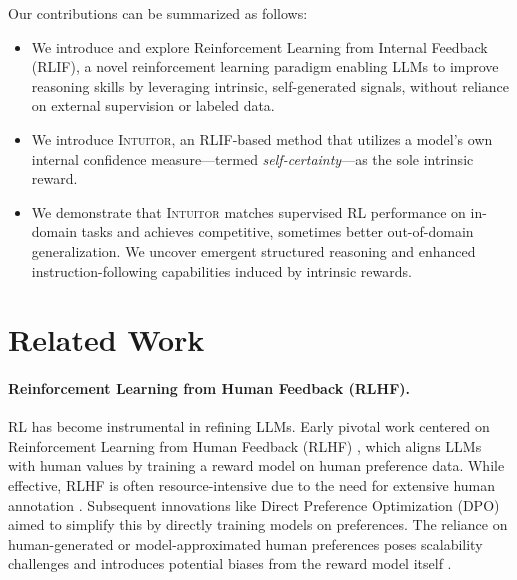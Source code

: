 \documentclass{article} %
\newcommand{\methodname}{\textsc{Intuitor}\xspace}
\begin{document}
Our contributions can be summarized as follows:
\begin{itemize}[leftmargin=*, nosep]
  \item We introduce and explore Reinforcement Learning from Internal Feedback (RLIF), a novel reinforcement learning paradigm enabling LLMs to improve reasoning skills by leveraging intrinsic,  self-generated signals, without reliance on external supervision or labeled data.
  \item We introduce \methodname, an RLIF-based method that utilizes a model's own internal confidence measure—termed \emph{self-certainty}—as the sole intrinsic reward. 
  \item We demonstrate that \methodname matches supervised RL performance on in-domain tasks and achieves competitive, sometimes better out-of-domain generalization. We uncover emergent structured reasoning and enhanced instruction-following capabilities induced by intrinsic rewards.
\end{itemize}


\section{Related Work}

\paragraph{Reinforcement Learning from Human Feedback (RLHF).}  RL has become instrumental in refining LLMs. Early pivotal work centered on Reinforcement Learning from Human Feedback (RLHF) \citep{ouyang2022training}, which aligns LLMs with human values by training a reward model on human preference data. While effective, RLHF is often resource-intensive due to the need for extensive human annotation \citep{touvron2023llama}. Subsequent innovations like Direct Preference Optimization (DPO) \citep{rafailov2023direct} aimed to simplify this by directly training models on preferences. The reliance on human-generated or model-approximated human preferences poses scalability challenges and introduces potential biases from the reward model itself \citep{gao2023scaling}.
\end{document}
